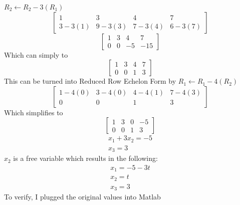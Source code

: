 \documentclass[12pt,letterpaper, onecolumn]{exam}
\begin{document}
\begin{questions}
\begin{solution}
\begin{center}
                $R_2 \leftarrow R_2 - 3(R_1)$
                $$
                \begin{bmatrix}
                    1 & 3 & 4 & 7\\
                    3 - 3(1) & 9 - 3(3) & 7 - 3(4) & 6 - 3(7)
                \end{bmatrix}
                $$
                $$
                \begin{bmatrix}
                    1 & 3 & 4 & 7\\
                    0 & 0 & -5 & -15
                \end{bmatrix}
                $$
                Which can simply to
                $$
                \begin{bmatrix}
                    1 & 3 & 4 & 7\\
                    0 & 0 & 1 & 3
                \end{bmatrix}
                $$
                This can be turned into Reduced Row Echelon Form by $R_1 \leftarrow R_1 -4(R_2)$
                $$
                \begin{bmatrix}
                    1 - 4(0) & 3 - 4(0) & 4 - 4(1) & 7 - 4(3)\\
                    0 & 0 & 1 & 3
                \end{bmatrix}
                $$
                Which simplifies to
                $$
                \begin{bmatrix}
                    1 & 3 & 0 & -5\\
                    0 & 0 & 1 & 3
                \end{bmatrix}
                $$
                $$
                \begin{matrix}
                    x_1 + 3x_2 = -5\\
                    x_3 = 3
                \end{matrix}
                $$
                $x_2$ is a free variable which results in the following:
                $$
                \begin{matrix}
                    x_1 = -5 -3t\\
                    x_2 = t\\
                    x_3 = 3
                \end{matrix}
                $$
                To verify, I plugged the original values into Matlab\\
                \begin{center}

\end{center}
\end{center}
\end{solution}
\end{questions}
\end{document}
